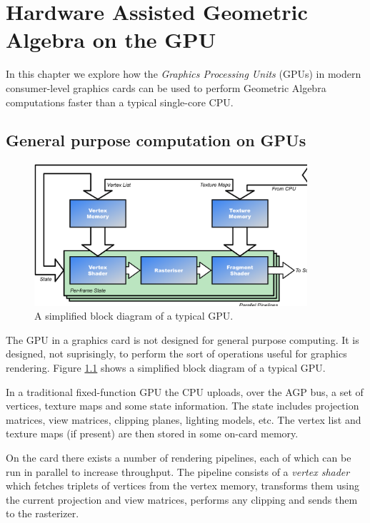 \chapter{Hardware Assisted Geometric Algebra on the GPU}

In this chapter we explore how the \emph{Graphics Processing
Units} (GPUs) in modern consumer-level graphics cards can be
used to perform Geometric Algebra computations faster than a 
typical single-core CPU.

\section{General purpose computation on GPUs}

\begin{figure}
\centering
\includegraphics[width=0.9\textwidth]{gpu_architecture}
\caption{\label{fig:gpu_architecture}%
  A simplified block diagram of a typical GPU.}
\end{figure}

The GPU in a graphics card is not designed for general purpose 
computing. It is designed, not suprisingly, to perform the
sort of operations useful for graphics rendering. Figure
\ref{fig:gpu_architecture} shows a simplified block diagram of
a typical GPU.

In a traditional fixed-function GPU the CPU uploads, over the AGP
bus, a set of vertices, texture maps and some state information. The
state includes projection matrices, view matrices, clipping planes, 
lighting models, etc. The vertex list and texture maps (if present) 
are then stored in some on-card memory.

On the card there exists a number of rendering pipelines, each of which
can be run in parallel to increase throughput. The pipeline consists
of a \emph{vertex shader} which fetches triplets of vertices from
the vertex memory, transforms them using the current projection and 
view matrices, performs any clipping and sends them to the rasterizer.


